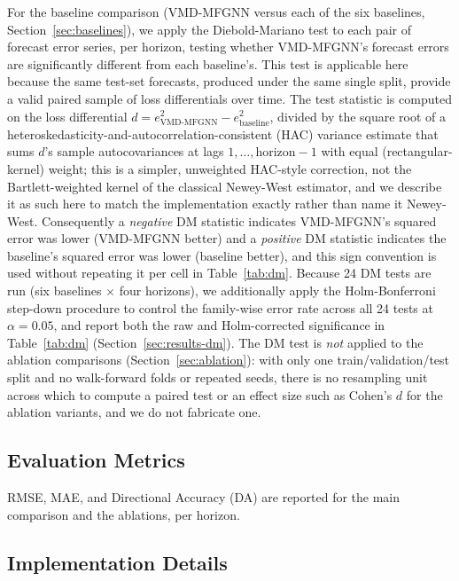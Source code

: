 \documentclass[journal]{IEEEtran}
\begin{document}
For the baseline comparison (VMD-MFGNN versus each of the six baselines, Section~\ref{sec:baselines}), we apply the Diebold-Mariano test \citep{DieboldMariano1995} to each pair of forecast error series, per horizon, testing whether VMD-MFGNN's forecast errors are significantly different from each baseline's. This test is applicable here because the same test-set forecasts, produced under the same single split, provide a valid paired sample of loss differentials over time. The test statistic is computed on the loss differential $d = e_{\text{VMD-MFGNN}}^2 - e_{\text{baseline}}^2$, divided by the square root of a heteroskedasticity-and-autocorrelation-consistent (HAC) variance estimate that sums $d$'s sample autocovariances at lags $1,\ldots,\text{horizon}-1$ with equal (rectangular-kernel) weight; this is a simpler, unweighted HAC-style correction, not the Bartlett-weighted kernel of the classical Newey-West estimator, and we describe it as such here to match the implementation exactly rather than name it Newey-West. Consequently a \emph{negative} DM statistic indicates VMD-MFGNN's squared error was lower (VMD-MFGNN better) and a \emph{positive} DM statistic indicates the baseline's squared error was lower (baseline better), and this sign convention is used without repeating it per cell in Table~\ref{tab:dm}. Because 24 DM tests are run (six baselines $\times$ four horizons), we additionally apply the Holm-Bonferroni step-down procedure to control the family-wise error rate across all 24 tests at $\alpha=0.05$, and report both the raw and Holm-corrected significance in Table~\ref{tab:dm} (Section~\ref{sec:results-dm}). The DM test is \emph{not} applied to the ablation comparisons (Section~\ref{sec:ablation}): with only one train/validation/test split and no walk-forward folds or repeated seeds, there is no resampling unit across which to compute a paired test or an effect size such as Cohen's $d$ for the ablation variants, and we do not fabricate one.

\subsection{Evaluation Metrics}

RMSE, MAE, and Directional Accuracy (DA) are reported for the main comparison and the ablations, per horizon.

\subsection{Implementation Details}
\label{sec:impl}
\end{document}
